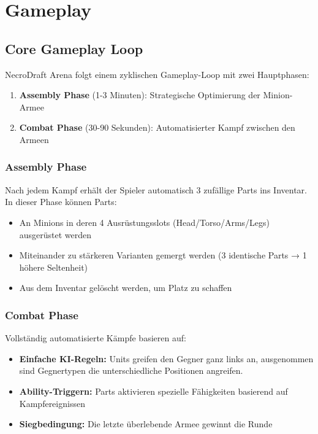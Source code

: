 \chapter{Gameplay}
\label{chap:gameplay}

\section{Core Gameplay Loop}

NecroDraft Arena folgt einem zyklischen Gameplay-Loop mit zwei Hauptphasen:

\begin{enumerate}
    \item \textbf{Assembly Phase} (1-3 Minuten): Strategische Optimierung der Minion-Armee
    \item \textbf{Combat Phase} (30-90 Sekunden): Automatisierter Kampf zwischen den Armeen
\end{enumerate}

\subsection{Assembly Phase}
Nach jedem Kampf erhält der Spieler automatisch 3 zufällige Parts ins Inventar. In dieser Phase können Parts:
\begin{itemize}
    \item An Minions in deren 4 Ausrüstungsslots (Head/Torso/Arms/Legs) ausgerüstet werden
    \item Miteinander zu stärkeren Varianten gemergt werden (3 identische Parts → 1 höhere Seltenheit)
    \item Aus dem Inventar gelöscht werden, um Platz zu schaffen
\end{itemize}

\subsection{Combat Phase}
Vollständig automatisierte Kämpfe basieren auf:
\begin{itemize}
    \item \textbf{Einfache KI-Regeln:} Units greifen den Gegner ganz links an, ausgenommen sind Gegnertypen die unterschiedliche Positionen angreifen.
    \item \textbf{Ability-Triggern:} Parts aktivieren spezielle Fähigkeiten basierend auf Kampfereignissen
    \item \textbf{Siegbedingung:} Die letzte überlebende Armee gewinnt die Runde
\end{itemize}

